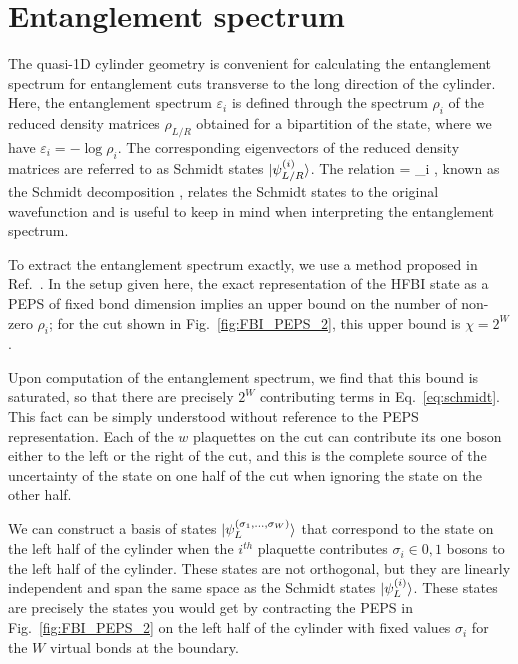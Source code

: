 
\newcommand{\uL}{\mathbf{L_0}}
\newcommand{\bL}{\mathbf{\bar{L}_0}}

\section{Entanglement spectrum}
\label{sec:ES}

The quasi-1D cylinder geometry is convenient for calculating the
entanglement spectrum for entanglement cuts transverse to the long direction of the
cylinder. Here, the entanglement spectrum $\varepsilon_i$ is defined through the spectrum
$\rho_i$ of the reduced density matrices $\rho_{L/R}$ obtained for a bipartition of the state,
where we have $\varepsilon_i = -\log \rho_i$.
The corresponding eigenvectors of the reduced density matrices
are referred to as Schmidt states $\vert \psi^{(i)}_{L/R} \rangle$. 
The relation 
\beq
\ket{\psi} = \sum\limits_i 
,
\label{eq:schmidt}
\eeq
known as the Schmidt decomposition \cite{Schmidt?},
relates the Schmidt states to the original wavefunction and is useful to keep in mind
when interpreting the entanglement spectrum.

To extract the entanglement spectrum exactly,
we use a method proposed in Ref.~.
In the setup given here, the exact representation of the HFBI state as a PEPS of
fixed bond dimension implies an upper bound on the number of non-zero $\rho_i$; 
for the cut shown in Fig.~\ref{fig:FBI_PEPS_2}, this upper bound is $\chi=2^W$.

Upon computation of the entanglement spectrum, we find that this bound is saturated,
so that there are precisely $2^W$ contributing terms in Eq.~\ref{eq:schmidt}.
This fact can be simply understood without reference to the PEPS representation. 
Each of the $w$ plaquettes on the cut can contribute its one boson either to the left
or the right of the cut, and this is the complete source of the uncertainty
of the state on one half of the cut when ignoring the state on the other half.

We can construct a basis of states $\vert \psi_L^{(\sigma_1, \ldots, \sigma_W)} \rangle$ that 
correspond to the state on the left half of the cylinder when the $i^{th}$ plaquette
contributes $\sigma_i \in {0, 1}$ bosons to the left half of the cylinder. 
These states are not orthogonal, but they are linearly independent and span the same
space as the Schmidt states $\vert \psi^{(i)}_{L} \rangle$.
These states are precisely the states you would get by contracting the PEPS in
Fig.~\ref{fig:FBI_PEPS_2} on the left half of the cylinder with fixed values
$\sigma_i$ for the $W$ virtual bonds at the boundary.

